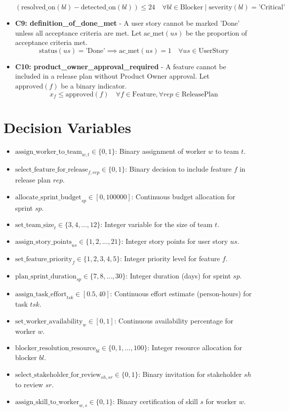 \documentclass[11pt]{article}
\begin{document}
\begin{itemize}
        \[ (\text{resolved\_on}(bl) - \text{detected\_on}(bl)) \leq 24 \quad \forall bl \in \text{Blocker} \mid \text{severity}(bl) = \text{'Critical'} \]
    \item \textbf{C9: definition\_of\_done\_met} - A user story cannot be marked 'Done' unless all acceptance criteria are met. Let $\text{ac\_met}(us)$ be the proportion of acceptance criteria met.
        \[ \text{status}(us) = \text{'Done'} \implies \text{ac\_met}(us) = 1 \quad \forall us \in \text{UserStory} \]
    \item \textbf{C10: product\_owner\_approval\_required} - A feature cannot be included in a release plan without Product Owner approval. Let $\text{approved}(f)$ be a binary indicator.
        \[ x_f \leq \text{approved}(f) \quad \forall f \in \text{Feature}, \forall rep \in \text{ReleasePlan} \]
\end{itemize}

\section{Decision Variables}
\begin{itemize}
    \item $\text{assign\_worker\_to\_team}_{w,t} \in \{0, 1\}$: Binary assignment of worker $w$ to team $t$.
    \item $\text{select\_feature\_for\_release}_{f,rep} \in \{0, 1\}$: Binary decision to include feature $f$ in release plan $rep$.
    \item $\text{allocate\_sprint\_budget}_{sp} \in [0, 100000]$: Continuous budget allocation for sprint $sp$.
    \item $\text{set\_team\_size}_t \in \{3, 4, ..., 12\}$: Integer variable for the size of team $t$.
    \item $\text{assign\_story\_points}_{us} \in \{1, 2, ..., 21\}$: Integer story points for user story $us$.
    \item $\text{set\_feature\_priority}_f \in \{1, 2, 3, 4, 5\}$: Integer priority level for feature $f$.
    \item $\text{plan\_sprint\_duration}_{sp} \in \{7, 8, ..., 30\}$: Integer duration (days) for sprint $sp$.
    \item $\text{assign\_task\_effort}_{tsk} \in [0.5, 40]$: Continuous effort estimate (person-hours) for task $tsk$.
    \item $\text{set\_worker\_availability}_w \in [0, 1]$: Continuous availability percentage for worker $w$.
    \item $\text{blocker\_resolution\_resource}_{bl} \in \{0, 1, ..., 100\}$: Integer resource allocation for blocker $bl$.
    \item $\text{select\_stakeholder\_for\_review}_{sh, sr} \in \{0, 1\}$: Binary invitation for stakeholder $sh$ to review $sr$.
    \item $\text{assign\_skill\_to\_worker}_{w,s} \in \{0, 1\}$: Binary certification of skill $s$ for worker $w$.
\end{itemize}
\end{document}
